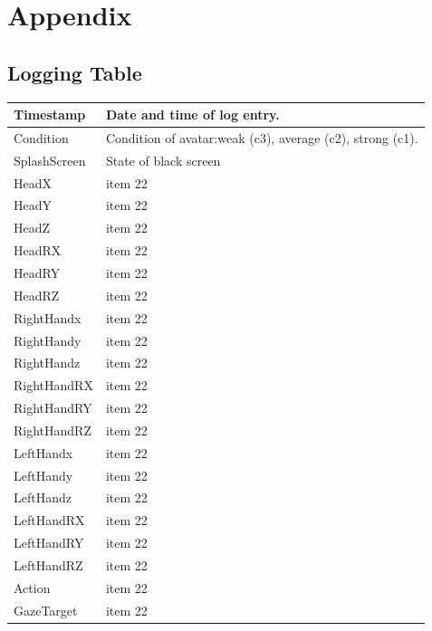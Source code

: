 \section{Appendix}

\subsection{Logging Table}
\label{subsection:appendixLogging}

\begin{tabu} to 0.8\textwidth { | X[l] | X[c] | }
 \hline
 Timestamp & Date and time of log entry. \\
 \hline
 Condition  & Condition of avatar:weak (c3), average (c2), strong (c1).   \\
\hline
 SplashScreen  & State of black screen     \\
\hline
 HeadX  & item 22    \\
\hline
 HeadY  & item 22    \\
\hline
 HeadZ  & item 22    \\
\hline
 HeadRX  & item 22    \\
\hline
 HeadRY  & item 22    \\
\hline
 HeadRZ  & item 22    \\
\hline
 RightHandx  & item 22    \\
\hline
 RightHandy  & item 22    \\
\hline
 RightHandz  & item 22    \\
\hline
 RightHandRX  & item 22    \\
\hline
 RightHandRY  & item 22    \\
\hline
 RightHandRZ  & item 22    \\
\hline
LeftHandx  & item 22    \\
\hline
 LeftHandy  & item 22    \\
\hline
 LeftHandz  & item 22    \\
\hline
 LeftHandRX  & item 22    \\
\hline
 LeftHandRY  & item 22    \\
\hline
 LeftHandRZ  & item 22    \\
\hline
 Action  & item 22    \\
\hline
 GazeTarget  & item 22    \\
\hline
\end{tabu}

